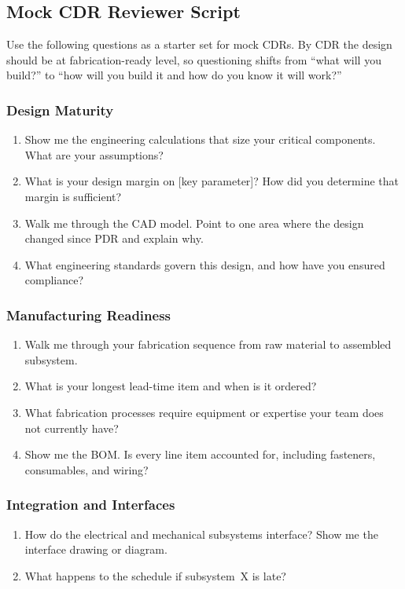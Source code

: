 \subsection{Mock CDR Reviewer Script}

Use the following questions as a starter set for mock CDRs. By CDR the design should be at fabrication-ready level, so questioning shifts from ``what will you build?'' to ``how will you build it and how do you know it will work?''

\subsubsection*{Design Maturity}
\begin{enumerate}[nosep,leftmargin=1.5em]
\item Show me the engineering calculations that size your critical components. What are your assumptions?
\item What is your design margin on [key parameter]? How did you determine that margin is sufficient?
\item Walk me through the CAD model. Point to one area where the design changed since PDR and explain why.
\item What engineering standards govern this design, and how have you ensured compliance?
\end{enumerate}

\subsubsection*{Manufacturing Readiness}
\begin{enumerate}[nosep,leftmargin=1.5em,start=5]
\item Walk me through your fabrication sequence from raw material to assembled subsystem.
\item What is your longest lead-time item and when is it ordered?
\item What fabrication processes require equipment or expertise your team does not currently have?
\item Show me the BOM. Is every line item accounted for, including fasteners, consumables, and wiring?
\end{enumerate}

\subsubsection*{Integration and Interfaces}
\begin{enumerate}[nosep,leftmargin=1.5em,start=9]
\item How do the electrical and mechanical subsystems interface? Show me the interface drawing or diagram.
\item What happens to the schedule if subsystem~X is late?
\end{enumerate}

